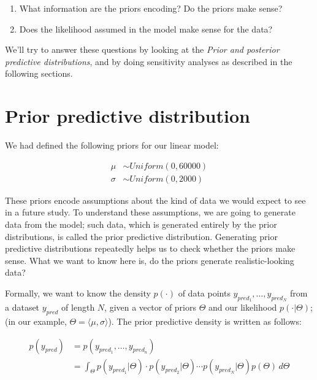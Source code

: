 \documentclass[12pt,]{krantz}
\providecommand{\tightlist}{%
  \setlength{\itemsep}{0pt}\setlength{\parskip}{0pt}}
\theoremstyle{definition}
\theoremstyle{definition}
\theoremstyle{definition}
\theoremstyle{remark}
\begin{document}
\begin{enumerate}
\def\labelenumi{\arabic{enumi}.}
\tightlist
\item
  What information are the priors encoding? Do the priors make sense?
\item
  Does the likelihood assumed in the model make sense for the data?
\end{enumerate}

We'll try to answer these questions by looking at the \emph{Prior and
posterior predictive distributions}, and by doing sensitivity analyses
as described in the following sections.

\section{Prior predictive distribution}\label{sec:priorpred}

We had defined the following priors for our linear model:

\begin{equation}
\begin{aligned}
\mu &\sim Uniform(0, 60000) \\
\sigma &\sim Uniform(0, 2000) 
\label{eq:rtpriorsrepeated}
\end{aligned}
\end{equation}

These priors encode assumptions about the kind of data we would expect
to see in a future study. To understand these assumptions, we are going
to generate data from the model; such data, which is generated entirely
by the prior distributions, is called the prior predictive distribution.
Generating prior predictive distributions repeatedly helps us to check
whether the priors make sense. What we want to know here is, do the
priors generate realistic-looking data?

Formally, we want to know the density \(p(\cdot)\) of data points
\(y_{pred_1},\dots,y_{pred_N}\) from a dataset \(y_{pred}\) of length
\(N\), given a vector of priors \(\Theta\) and our likelihood
\(p(\cdot|\Theta)\); (in our example,
\(\Theta=\langle\mu,\sigma \rangle\)). The prior predictive density is
written as follows:

\begin{equation}
\begin{aligned}
p(y_{pred}) &= p(y_{pred_1},\dots,y_{pred_n})\\
&= \int_\Theta p(y_{pred_1}|\Theta)\cdot p(y_{pred_2}|\Theta)\cdots p(y_{pred_N}|\Theta) p(\Theta) \, d\Theta 
\end{aligned}
\end{equation}
\end{document}
